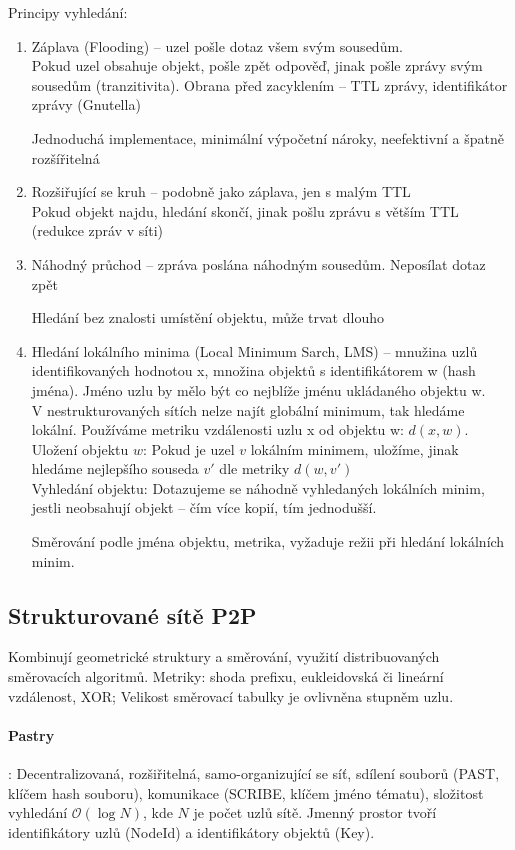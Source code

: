 \documentclass[a4paper, 11pt]{report}
\begin{document}
Principy vyhledání:
\begin{enumerate}
	\item Záplava (Flooding) -- uzel pošle dotaz všem svým sousedům.\\
	Pokud uzel obsahuje objekt, pošle zpět odpověď, jinak pošle zprávy svým sousedům (tranzitivita). Obrana před zacyklením -- TTL zprávy, identifikátor zprávy (Gnutella)
	
	Jednoduchá implementace, minimální výpočetní nároky, neefektivní a špatně rozšířitelná
	\item Rozšiřující se kruh -- podobně jako záplava, jen s malým TTL\\
	Pokud objekt najdu, hledání skončí, jinak pošlu zprávu s větším TTL (redukce zpráv v síti)
	\item Náhodný průchod -- zpráva poslána náhodným sousedům. Neposílat dotaz zpět
	
	Hledání bez znalosti umístění objektu, může trvat dlouho
	\item Hledání lokálního minima (Local Minimum Sarch, LMS) -- mnužina uzlů identifikovaných hodnotou x, množina objektů s identifikátorem w (hash jména). Jméno uzlu by mělo být co nejblíže jménu ukládaného objektu w.\\
	V nestrukturovaných sítích nelze najít globální minimum, tak hledáme lokální. Používáme metriku vzdálenosti uzlu x od objektu w: $d(x, w)$.\\
	Uložení objektu $w$: Pokud je uzel $v$ lokálním minimem, uložíme, jinak hledáme nejlepšího souseda $v'$ dle metriky $d(w, v')$\\
	Vyhledání objektu: Dotazujeme se náhodně vyhledaných lokálních minim, jestli neobsahují objekt -- čím více kopií, tím jednodušší.
	
	Směrování podle jména objektu, metrika, vyžaduje režii při hledání lokálních minim.
\end{enumerate}

\subsection{Strukturované sítě P2P}

Kombinují geometrické struktury a směrování, využití distribuovaných směrovacích algoritmů. Metriky: shoda prefixu, eukleidovská či lineární vzdálenost, XOR; Velikost směrovací tabulky je ovlivněna stupněm uzlu.

\paragraph{Pastry}: Decentralizovaná, rozšiřitelná, samo-organizující se síť, sdílení souborů (PAST, klíčem hash souboru), komunikace (SCRIBE, klíčem jméno tématu), složitost vyhledání $\mathcal{O}(\log N)$, kde $N$ je počet uzlů sítě.
Jmenný prostor tvoří identifikátory uzlů (NodeId) a identifikátory objektů (Key).
\end{document}
